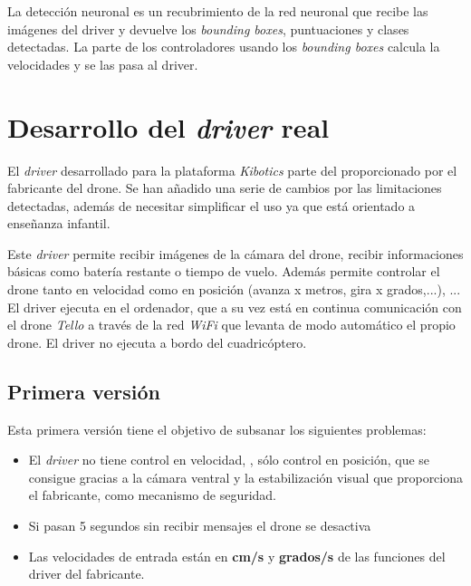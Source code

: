 La detección neuronal es un recubrimiento de la red neuronal que recibe las imágenes del driver y devuelve los \textit{bounding boxes}, puntuaciones y clases detectadas. 
La parte de los controladores usando los \textit{bounding boxes} calcula la velocidades y se las pasa al driver.


\section{Desarrollo del \textit{driver} real}
El \textit{driver} desarrollado para la plataforma \textit{Kibotics} parte del proporcionado por el fabricante del drone. Se han añadido una serie de cambios por las limitaciones detectadas, además de necesitar simplificar el uso ya que está orientado a enseñanza infantil. 

Este \textit{driver} permite recibir imágenes de la cámara del drone, recibir informaciones básicas como batería restante o tiempo de vuelo. Además permite controlar el drone tanto en velocidad como en posición (avanza x metros, gira x grados,...), ...\\

El driver ejecuta en el ordenador, que a su vez está en continua comunicación con el drone \textit{Tello} a través de la red \textit{WiFi} que levanta de modo automático el propio drone. El driver no ejecuta a bordo del cuadricóptero.

\subsection{Primera versión}
Esta primera versión tiene el objetivo de subsanar los siguientes problemas:
\begin{itemize}
  \item El \textit{driver} no tiene control en velocidad, , sólo control en posición, que se consigue gracias a la cámara ventral y la estabilización visual que proporciona el fabricante, como mecanismo de seguridad.
  \item Si pasan 5 segundos sin recibir mensajes el drone se desactiva
  \item Las velocidades de entrada están en \textbf{cm/s} y \textbf{grados/s} de las funciones del driver del fabricante.
\end{itemize}

